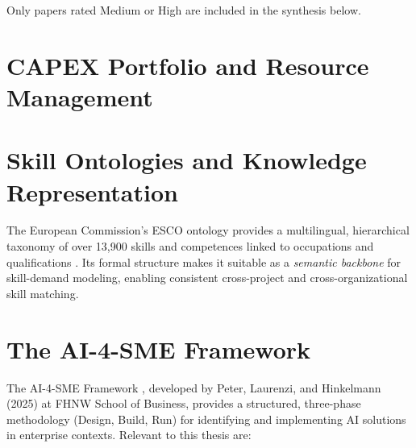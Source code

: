 Only papers rated Medium or High are included in the synthesis below.

\section{CAPEX Portfolio and Resource Management}
\label{sec:lit_capex}


\section{Skill Ontologies and Knowledge Representation}
\label{sec:lit_ontologies}

The European Commission's ESCO ontology provides a multilingual, hierarchical taxonomy of over 13,900 skills and competences linked to occupations and qualifications \citep{le2014esco}. Its formal structure makes it suitable as a \textit{semantic backbone} for skill-demand modeling, enabling consistent cross-project and cross-organizational skill matching.


\section{The AI-4-SME Framework}
\label{sec:lit_ai4sme}

The AI-4-SME Framework \citep{peter2025ai4sme}, developed by Peter, Laurenzi, and Hinkelmann (2025) at FHNW School of Business, provides a structured, three-phase methodology (Design, Build, Run) for identifying and implementing AI solutions in enterprise contexts. Relevant to this thesis are:

